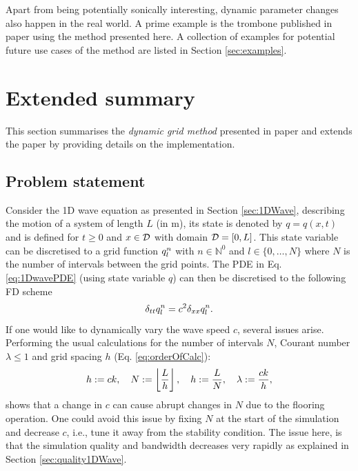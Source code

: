 Apart from being potentially sonically interesting, dynamic parameter changes also happen in the real world. A prime example is the trombone published in paper \citeP[H] using the method presented here. A collection of examples for potential future use cases of the method are listed in Section \ref{sec:examples}.

\section{Extended summary}
This section summarises the \textit{dynamic grid method} presented in paper \citeP[G] and extends the paper by providing details on the implementation. 

\subsection{Problem statement}
Consider the 1D wave equation  as presented in Section \ref{sec:1DWave}, describing the motion of a system of length $L$ (in m), its state is denoted by $q = q(x,t)$ and is defined for $t\geq 0$ and $x\in\mathcal{D}$ with domain $\mathcal{D} = [0, L]$. This state variable can be discretised to a grid function $q_l^n$ with $n\in \mathbb{N}^0$ and $l \in \{0, \hdots, N\}$ where $N$ is the number of intervals between the grid points. The PDE in Eq. \eqref{eq:1DwavePDE} (using state variable $q$) can then be discretised to the following FD scheme
\begin{equation}\label{eq:1DWaveDynamic}
    \delta_{tt} q_l^n = c^2\delta_{xx} q_l^n.
\end{equation}
If one would like to dynamically vary the wave speed $c$, several issues arise. Performing the usual calculations for the number of intervals $N$, Courant number $\lambda\leq 1$ and grid spacing $h$ (Eq. \eqref{eq:orderOfCalc}):
\begin{equation}\label{eq:dynamicOrderOfCalc}
    h := ck, \quad N := \floor[\frac{L}{h}], \quad h := \frac{L}{N}, \quad \lambda := \frac{ck}{h},
\end{equation}
shows that a change in $c$ can cause abrupt changes in $N$ due to the flooring operation. One could avoid this issue by fixing $N$ at the start of the simulation and decrease $c$, i.e., tune it away from the stability condition. The issue here, is that the simulation quality and bandwidth decreases very rapidly as explained in Section \ref{sec:quality1DWave}. 

